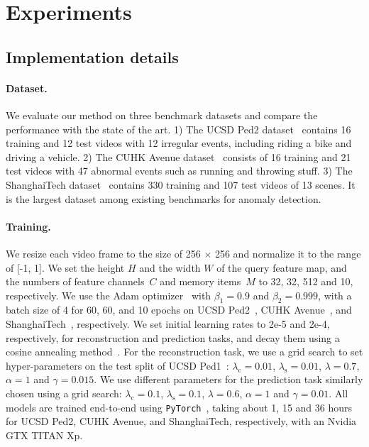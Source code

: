 \documentclass[10pt,twocolumn,letterpaper]{article}
\begin{document}
\vspace{-0.2cm}        
\section{Experiments}
\vspace{-0.1cm}    
	\subsection{Implementation details}
\vspace{-0.1cm}    
		\paragraph{Dataset.}
			We evaluate our method on three benchmark datasets and compare the performance with the state of the art. 1) The UCSD Ped2 dataset~\cite{li2013anomaly} contains 16 training and 12 test videos with 12 irregular events, including riding a bike and driving a vehicle. 2) The CUHK Avenue dataset~\cite{lu2013abnormal} consists of 16 training and 21 test videos with 47 abnormal events such as running and throwing stuff. 3) The ShanghaiTech dataset~\cite{luo2017revisit} contains 330 training and 107 test videos of 13 scenes. It is the largest dataset among existing benchmarks for anomaly detection. 
		
\vspace{-0.5cm}    
		\paragraph{Training.}
			We resize each video frame to the size of 256 $\times$ 256 and normalize it to the range of [-1, 1]. We set the height $H$ and the width $W$ of the query feature map, and the numbers of feature channels~$C$ and memory items~$M$ to 32, 32, 512 and 10, respectively. We use the Adam optimizer~\cite{kingma2014adam} with $\beta_1=0.9$ and $\beta_2=0.999$, with a batch size of 4 for 60, 60, and 10 epochs on UCSD Ped2~\cite{li2013anomaly}, CUHK Avenue~\cite{lu2013abnormal}, and ShanghaiTech~\cite{luo2017revisit}, respectively. We set initial learning rates to 2e-5 and 2e-4, respectively, for reconstruction and prediction tasks, and decay them using a cosine annealing method~\cite{loshchilov2016sgdr}. For the reconstruction task, we use a grid search to set hyper-parameters on the test split of UCSD Ped1~\cite{li2013anomaly}: $\lambda_\mathrm{c}= 0.01$, $\lambda_\mathrm{s}= 0.01$, $\lambda=0.7$, $\alpha=1$ and $\gamma=0.015$. We use different parameters for the prediction task similarly chosen using a grid search: $\lambda_\mathrm{c}= 0.1$, $\lambda_\mathrm{s} = 0.1$, $\lambda=0.6$, $\alpha=1$ and $\gamma=0.01$. All models are trained end-to-end using \texttt{PyTorch}~\cite{paszke2017automatic}, taking about 1, 15 and 36 hours for UCSD Ped2, CUHK Avenue, and ShanghaiTech, respectively, with an Nvidia GTX TITAN Xp.
\end{document}
